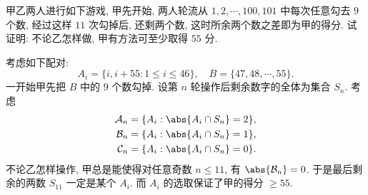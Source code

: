 \begin{prob}
\label{prob:prob-7}
甲乙两人进行如下游戏, 甲先开始, 两人轮流从
$1, 2, \cdots, 100, 101$ 中每次任意勾去 $9$ 个数,
经过这样 $11$ 次勾掉后, 还剩两个数,
这时所余两个数之差即为甲的得分.
试证明: 不论乙怎样做, 甲有方法可至少取得 $55$ 分.
\end{prob}

\begin{soln}
考虑如下配对:
\[
A_i = \{i, i + 55: 1 \le i \le 46\}, \quad
B = \{47, 48, \cdots, 55\}.
\]
一开始甲先把 $B$ 中的 $9$ 个数勾掉.
设第 $n$ 轮操作后剩余数字的全体为集合 $S_n$.
考虑
\begin{align*}
\mathcal{A}_n &= \{A_i: \abs{A_i\cap S_n} = 2\}, \\
\mathcal{B}_n &= \{A_i: \abs{A_i\cap S_n} = 1\}, \\
\mathcal{C}_n &= \{A_i: \abs{A_i\cap S_n} = 0\}.
\end{align*}
不论乙怎样操作, 甲总是能使得对任意奇数 $n \le 11$, 有
$\abs{\mathcal{B}_n} = 0$.
于是最后剩余的两数 $S_{11}$ 一定是某个 $A_i$.
而 $A_i$ 的选取保证了甲的得分 $\ge 55$.
\end{soln}
